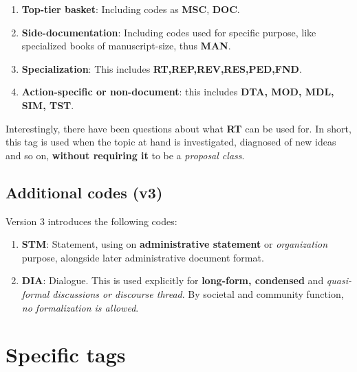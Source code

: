 \documentclass[9pt,a4paper]{article}
\begin{document}
\begin{enumerate}
    \item \textbf{Top-tier basket}: Including codes as \textbf{MSC}, \textbf{DOC}. 
    \item \textbf{Side-documentation}: Including codes used for specific purpose, like specialized books of manuscript-size, thus \textbf{MAN}. 
    \item \textbf{Specialization}: This includes \textbf{RT,REP,REV,RES,PED,FND}. 
    \item \textbf{Action-specific or non-document}: this includes \textbf{DTA, MOD, MDL, SIM, TST}. 
\end{enumerate}

Interestingly, there have been questions about what \textbf{RT} can be used for. In short, this tag is used when the topic at hand is investigated, diagnosed of new ideas and so on, \textbf{without requiring it} to be a \textit{proposal class}. 

\subsection{Additional codes (v3)}

Version 3 introduces the following codes:

\begin{enumerate}
    \item \textbf{STM}: Statement, using on \textbf{administrative statement} or \textit{organization} purpose, alongside later administrative document format. 
    \item \textbf{DIA}: Dialogue. This is used explicitly for \textbf{long-form, condensed} and \textit{quasi-formal discussions or discourse thread}. By societal and community function, \textit{no formalization is allowed}. 
\end{enumerate}

\section{Specific tags}
\end{document}
